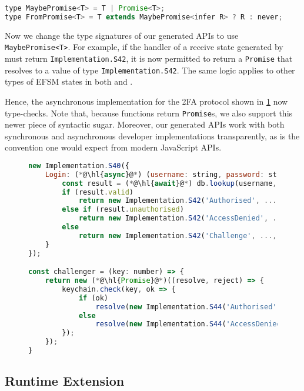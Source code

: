 \begin{lstlisting}[language=javascript,numbers=none]
type MaybePromise<T> = T | Promise<T>;
type FromPromise<T> = T extends MaybePromise<infer R> ? R : never;
\end{lstlisting}

Now we change the type signatures of our generated APIs
to use \texttt{MaybePromise<T>}.
For example, if the handler of a receive state generated by
 must return \texttt{Implementation.S42},
it is now permitted to return a \texttt{Promise} that resolves
to a value of type \texttt{Implementation.S42}.
The same logic applies to other types of EFSM states
in both  and .

Hence, the asynchronous  implementation
for the 2FA protocol shown in \cref{lst:new2fa}
now type-checks. Note that, because 
 functions return \texttt{Promise}s,
we also support this newer piece of syntactic sugar.
Moreover, our generated APIs work with both synchronous
and asynchronous developer implementations transparently,
as is the convention one would expect from modern JavaScript APIs.

\begin{figure}[!h]
\begin{lstlisting}[language=javascript,tabsize=2]
new Implementation.S40({
	Login: (*@\hl{async}@*) (username: string, password: string) => {
		const result = (*@\hl{await}@*) db.lookup(username, password);
		if (result.valid)
			return new Implementation.S42('Authorised', ...);
		else if (result.unauthorised)
			return new Implementation.S42('AccessDenied', ...);
		else
			return new Implementation.S42('Challenge', ..., challenger);
	}
});

const challenger = (key: number) => {
	return new (*@\hl{Promise}@*)((resolve, reject) => {
		keychain.check(key, ok => {
			if (ok)
				resolve(new Implementation.S44('Authorised', ...);
			else 
				resolve(new Implementation.S44('AccessDenied', ...);	
		});
	});
}
\end{lstlisting}
\label{lst:new2fa}
\end{figure}

\subsection{Runtime Extension}
\label{subsection:asyncruntime}

